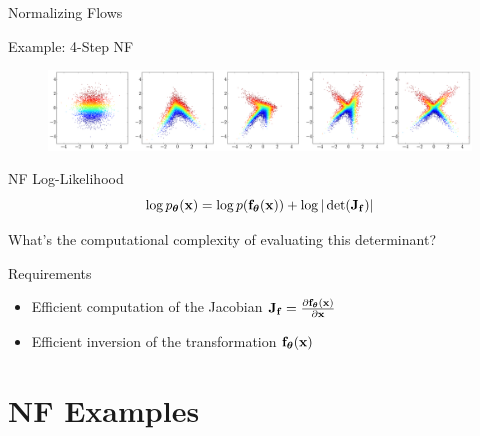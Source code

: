 \documentclass{beamer}
\begin{document}
\begin{frame}{Normalizing Flows}
	\begin{block}{Example: 4-Step NF}
		\vspace{-0.2cm}
		\begin{figure}
			\includegraphics[width=\linewidth]{figs/flow_4_steps_example.png}
		\end{figure}
	\end{block}
    \eqpause
	\vspace{-0.5cm}
	\begin{block}{NF Log-Likelihood}
		\vspace{-0.3cm}
		\[
			\log p_{\boldsymbol{\theta}}(\mathbf{x}) = \log p(\mathbf{f}_{\boldsymbol{\theta}}(\mathbf{x})) + \log |\det ( \mathbf{J}_{\mathbf{f}})|
		\]
		\vspace{-0.5cm}
	\end{block}
	What's the computational complexity of evaluating this determinant?
    \eqpause
	\begin{block}{Requirements}
		\begin{itemize}
			\item Efficient computation of the Jacobian $\mathbf{J}_{\mathbf{f}} = \frac{\partial \mathbf{f}_{\boldsymbol{\theta}}(\mathbf{x})}{\partial \mathbf{x}}$
			\item Efficient inversion of the transformation $\mathbf{f}_{\boldsymbol{\theta}}(\mathbf{x})$
		\end{itemize}
	\end{block}
\end{frame}
\section{NF Examples}
\end{document}
